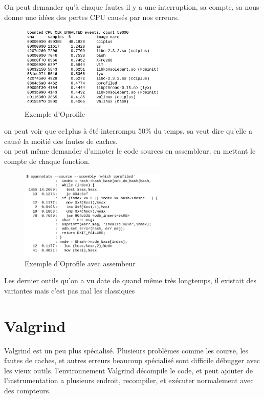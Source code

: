 \documentclass[oneside]{book}
\begin{document}
On peut demander qu'à chaque fautes il y a une interruption, sa compte, sa nous donne une idées des pertes CPU causés par nos erreurs. \\

\begin{figure}[!ht]
\centering
\includegraphics[width = 7cm]{oprofile.png}
\caption{Exemple d'Oprofile}
\label{fig:oprofile}
\end{figure}

on peut voir que cc1plus à été interrompu 50\% du temps, sa veut dire qu'elle a causé la moitié des fautes de caches.\\

on peut même demander d'annoter le code sources en assembleur, en mettant le compte de chaque fonction.\\

\begin{figure}[!ht]
\centering
\includegraphics[width = 7cm]{oprofile_assembleur.png}
\caption{Exemple d'Oprofile avec assembeur}
\label{fig:oprofile_assembly}
\end{figure}

Les dernier outils qu'on a vu date de quand même très longtemps, il existait des variantes mais c'est pas mal les classiques

\section{Valgrind}
Valgrind est un peu plus spécialisé. Plusieurs problèmes comme les course, les fautes de caches, et autres erreurs beaucoup spécialisé sont difficile débugger avec les vieux outils. l'environnement Valgrind décompile le code, et peut ajouter de l'instrumentation a plusieurs endroit, recompiler, et exécuter normalement avec des compteurs. \\
\end{document}
